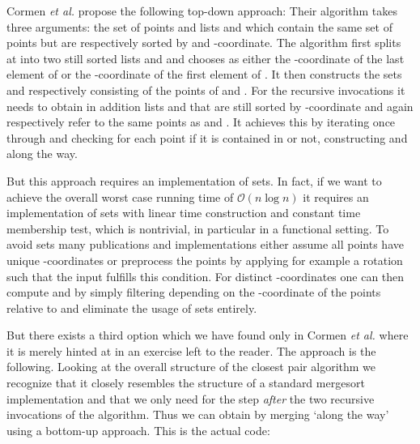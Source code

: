 \begin{isabellebody}
\begin{isamarkuptext}
Cormen \emph{et al.} propose the following top-down approach: Their algorithm takes three arguments: the set
of points  and lists  and  which contain the same set of points  but are respectively
sorted by  and -coordinate. The algorithm first splits  at  into two still
sorted lists  and  and chooses  as either the -coordinate of the last element of 
or the -coordinate of the first element of . It then constructs the sets  and  respectively consisting
of the points of  and . For the recursive invocations it needs to obtain in addition lists
 and  that are still sorted by -coordinate and again respectively refer to the same points as
 and . It achieves this by iterating once through  and checking for each point if it is
contained in  or not, constructing  and  along the way.

But this approach requires an implementation of sets. In fact, if we want to
achieve the overall worst case running time of $\mathcal{O}(n \log n)$ it requires an implementation
of sets with linear time construction and constant time membership test, which is nontrivial, in
particular in a functional setting. To avoid sets many publications and implementations either assume
all points have unique -coordinates or preprocess the points by applying for example a rotation
such that the input fulfills this condition. For distinct -coordinates one can then compute 
and  by simply filtering  depending on the -coordinate of the points relative to  and
eliminate the usage of sets entirely.

But there exists a third option which we have found only in Cormen \emph{et al.} where it is merely hinted at in an exercise left to the reader. The approach is the following.
Looking at the overall structure of the closest pair algorithm
we recognize that it closely resembles the structure of a standard mergesort implementation and that
we only need  for the  step \emph{after} the two recursive invocations of the algorithm.
Thus we can obtain  by merging `along the way' using a bottom-up approach. This is the actual code:


\end{isamarkuptext}
\end{isabellebody}
